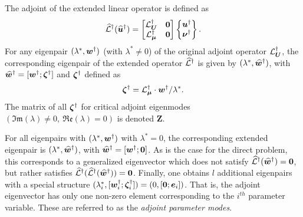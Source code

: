 The adjoint of the extended linear operator is defined as 
\begin{eqnarray}
	\mathcal{\widehat{L}}^{\dagger}({\widehat{\boldsymbol{u}}}^{\dagger}) =
	\begin{bmatrix}
		\mathcal{L}_{\boldsymbol{U}}^{\dagger} 		& \mathbf{0} \\
		\mathcal{L}_{\boldsymbol{\mu}}^{\dagger}	 & \mathbf{0}
	\end{bmatrix}
	\begin{Bmatrix}
		\boldsymbol{u}^{\dagger} \\
		\boldsymbol{\nu}^{\dagger}
	\end{Bmatrix}
\label{eqn:adjoint_operator_extended}.
\end{eqnarray}
For any eigenpair $(\lambda^{*},\boldsymbol{w}^{\dagger})$ (with $\lambda^{*}\ne 0$) of the original adjoint operator $\mathcal{L}_{\boldsymbol{U}}^{\dagger}$, the corresponding eigenpair of the extended operator $\mathcal{\widehat{L}}^{\dagger}$ is given by $(\lambda^{*}, {\widehat{\boldsymbol{w}}}^{\dagger})$, with ${\widehat{\boldsymbol{w}}}^{\dagger} = [\boldsymbol{w}^{\dagger}; \boldsymbol{\zeta}^{\dagger}]$ and  $\boldsymbol{\zeta}^{\dagger}$ defined as
\begin{eqnarray}
	\label{eqn:extended_adjoint_eigenvector}
	\boldsymbol{\zeta}^{\dagger} = \mathcal{L}_{\boldsymbol{\mu}}^{\dagger}\cdot\boldsymbol{w}^{\dagger}/\lambda^{*}.
\end{eqnarray}
The matrix of all $\boldsymbol{\zeta}^{\dagger}$ for critical  adjoint eigenmodes $(\mathfrak{Im}(\lambda)\ne 0,\ \mathfrak{Re}(\lambda)=0)$ is denoted $\mathbf{Z}$.

For all eigenpairs with $(\lambda^{*},\boldsymbol{w}^{\dagger})$ with $\lambda^{*} = 0$, the corresponding extended eigenpair is $(\lambda^{*},{\widehat{\boldsymbol{w}}}^{\dagger})$, with ${\widehat{\boldsymbol{w}}}^{\dagger} = [\boldsymbol{w}^{\dagger}; \boldsymbol{0}]$. As is the case for the direct problem, this corresponds to a generalized eigenvector which does not satisfy $\mathcal{\widehat{L}}^{\dagger}({\widehat{\boldsymbol{w}}}^{\dagger}) = \boldsymbol{0}$, but rather satisfies $\mathcal{\widehat{L}}^{\dagger}(\mathcal{\widehat{L}}^{\dagger}({\widehat{\boldsymbol{w}}}^{\dagger})) = \boldsymbol{0}$. Finally, one obtains $l$ additional eigenpairs with a special structure $(\lambda^{*}_{i},[\boldsymbol{w}^{\dagger}_{i};\boldsymbol{\zeta}^{\dagger}_{i}]) = (0,[\boldsymbol{0};\boldsymbol{e}_{i}])$. That is, the adjoint eigenvector has only one non-zero element corresponding to the $i^{th}$ parameter variable. These are referred to as the \emph{adjoint parameter modes}.

